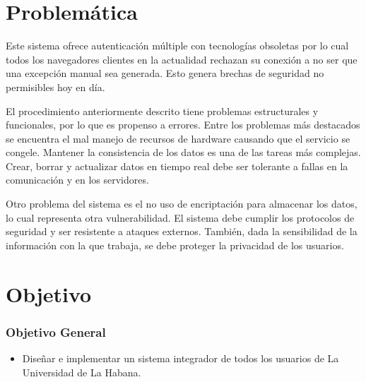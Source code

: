 \section*{Problemática}
 Este sistema ofrece autenticación múltiple con tecnologías obsoletas por lo cual todos los navegadores clientes en la actualidad rechazan su conexión a no ser que una excepción manual sea generada. Esto genera brechas de seguridad no permisibles hoy en día.

El procedimiento anteriormente descrito tiene problemas estructurales y funcionales, por lo que es propenso a errores. Entre los problemas más destacados se encuentra el mal manejo de recursos de hardware causando que el servicio se congele. Mantener la consistencia de los datos es una de las tareas m\'as complejas. Crear, borrar y actualizar  datos en tiempo real  debe ser tolerante a fallas en la comunicaci\'on y en los servidores. 

Otro problema del sistema es el no uso de encriptación para almacenar los datos, lo cual representa otra vulnerabilidad. El sistema debe cumplir los protocolos de seguridad y ser resistente a ataques externos. Tambi\'en, dada la sensibilidad de la informaci\'on con la que trabaja, se debe proteger la privacidad de los usuarios.

\section*{Objetivo}

\subsubsection*{Objetivo General}

\begin{itemize}	
	\item Diseñar e implementar un sistema integrador de todos los usuarios de La Universidad de La Habana. 
\end{itemize}

